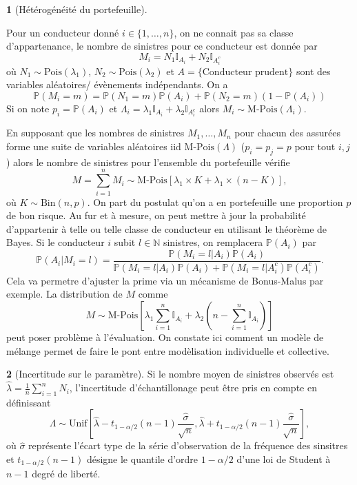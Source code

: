\documentclass[8pt,notheorems]{beamer}
\def \N{\mathbb N}
\def \P {\mathbb P}
\theoremstyle{definition}
\theoremstyle{example}
\newtheorem{example}{\translate{Example}}
\theoremstyle{mystyle}
\theoremstyle{plain}
\begin{document}
\begin{frame}[allowframebreaks]
\begin{example}[Hétérogénéité du portefeuille]
\begin{itemize}
 \end{itemize}
 Pour un conducteur donné $i\in\{1,\ldots,n\}$, on ne connait pas sa classe d'appartenance, le nombre de sinistres pour ce conducteur est donnée par
 $$
 M_i = N_1\mathbb{I}_{A_i} + N_2\mathbb{I}_{A^c_i}
 $$
 où $N_1\sim\text{Pois}(\lambda_1)$, $N_2\sim\text{Pois}(\lambda_2)$ et $A=\{\text{Conducteur prudent}\}$ sont des variables aléatoires/ évènements indépendants. On a
 $$
 \P(M_i = m) = \P(N_1 = m)\P(A_{i})+ \P(N_2 = m)(1-\P(A_{i}))
 $$
 Si on note $p_i=\P(A_{i})$ et $\Lambda_i = \lambda_1\mathbb{I}_{A_i}+\lambda_2\mathbb{I}_{A^{c}_i}$ alors $M_i\sim \text{M-Pois}(\Lambda_i)$.
\end{example}
 En supposant que les nombres de sinistres $M_1,\ldots,M_n$ pour chacun des assurées forme une suite de variables aléatoires iid $\text{M-Pois}(\Lambda)$ ($p_i=p_j=p$ pour tout $i,j$) alors le nombre de sinistres pour l'ensemble du portefeuille vérifie
 $$
 M=\sum_{i =1}^n M_i\sim \text{M-Pois}[\lambda_1\times K + \lambda_1\times (n-K)],
 $$
 où $K\sim \text{Bin}(n,p)$. On part du postulat qu'on a en portefeuille une proportion $p$ de bon risque. Au fur et à mesure, on peut mettre à jour la probabilité d'appartenir à telle ou telle classe de conducteur en utilisant le théorème de Bayes. Si le conducteur $i$ subit $l\in\N$ sinistres, on remplacera $\P(A_i)$ par
 $$
 \P(A_i|M_i=l) = \frac{\P(M_i = l|A_i)\P(A_i)}{\P(M_i = l|A_i)\P(A_i)+\P(M_i = l|A_i^c)\P(A_i^c)}.
 $$
Cela va permetre d'ajuster la prime via un mécanisme de Bonus-Malus par exemple. La distribution de $M$ comme
 $$
 M\sim \text{M-Pois}\left[\lambda_1\sum_{i=1}^n \mathbb{I}_{A_i} + \lambda_2\left(n-\sum_{i=1}^{n} \mathbb{I}_{A_i}\right) \right]
 $$
 peut poser problème à l'évaluation. On constate ici comment un modèle de mélange permet de faire le pont entre modèlisation individuelle et collective.
 \begin{example}[Incertitude sur le paramètre]
 Si le nombre moyen de sinistres observés est $\widehat{\lambda} =\frac{1}{n}\sum_{i=1}^nN_i$, l'incertitude d'échantillonage peut être pris en compte en définissant
 $$
 \Lambda\sim\text{Unif}\left[\widehat{\lambda}-t_{1-\alpha/2}(n-1)\frac{\widehat{\sigma}}{\sqrt{n}},\widehat{\lambda}+t_{1-\alpha/2}(n-1)\frac{\widehat{\sigma}}{\sqrt{n}}\right],
 $$
 où $\widehat{\sigma}$ représente l'écart type de la série d'observation de la fréquence des sinsitres et $t_{1-\alpha/2}(n-1)$ désigne le quantile d'ordre $1-\alpha/2$ d'une loi de Student à $n-1$ degré de liberté.

\end{example}
\end{frame}
\end{document}

